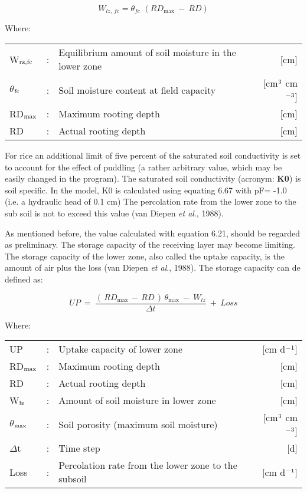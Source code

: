 \begin{equation}
W_{lz,\, fc} = \theta_{fc} \,\, (RD_{\max} ~-~RD)
\end{equation}

Where:\\[5pt]
\begin{tabularx}{\textwidth}{llXr}
W$_{{\rm rz,fc}}$ &:& Equilibrium amount of soil moisture in the lower zone  & [cm]\\
$\theta$$_{{\rm fc}}$ &:& Soil moisture content at field capacity  & [cm$^{{\rm 3}}$ cm$^{{\rm -3}}$]\\
RD$_{{\rm max}}$ &:& Maximum rooting depth  & [cm]\\
RD &:& Actual rooting depth  & [cm]\\
\end{tabularx}

For rice an addi\-tional limit of five percent of the saturated soil conductivity is set to
account for the effect of puddling (a rather arbitrary value, which may be easily changed
in the program). The saturated soil conductivity (acronym: {\bf K0}) is soil specific. In the
model, K0 is calculated using equating 6.67 with pF= -1.0 (i.e. a hydraulic head of 0.1
cm) The percolation rate from the lower zone to the sub soil is not to exceed this value
(van Diepen {\it et al\/}., 1988). 

As mentioned before, the value calculated with equation 6.21, should be regarded as
preliminary. The storage capacity of the receiving layer may become limiting. The
storage capacity of the lower zone, also called the uptake capacity, is the amount of air
plus the loss (van Diepen {\it et al\/}., 1988). The storage capacity can de defined as:

\begin{equation}
UP  ~=~{\frac{(\, RD _{\max } \, -\, RD\, )\, \theta  _{\max } ~-~ W _{lz} }{\Delta t}} ~+~ Loss
\end{equation}

Where:\\[5pt]
\begin{tabularx}{\textwidth}{llXr}
UP &:& Uptake capacity of lower zone  & [cm d$^{{\rm -1}}$]\\
RD$_{{\rm max}}$ &:& Maximum rooting depth  & [cm]\\
RD &:& Actual rooting depth  & [cm]\\
W$_{{\rm lz}}$ &:& Amount of soil moisture in lower zone  & [cm]\\
$\theta$$_{{\rm max}}$ &:& Soil porosity (maximum soil moisture)  & [cm$^{{\rm 3}}$ cm$^{{\rm -3}}$]\\
$\Delta$t &:& Time step  & [d]\\
Loss &:& Percolation rate from the lower zone to the subsoil   & [cm d$^{{\rm -1}}$]\\
\end{tabularx}

